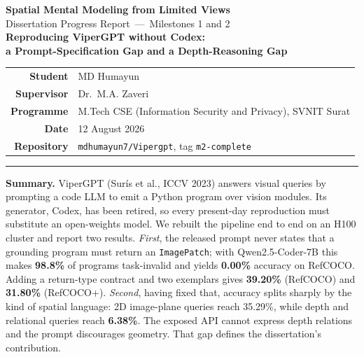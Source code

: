 \documentclass[11pt,a4paper]{article}
\newcommand{\up}[1]{\textcolor{good}{\textbf{#1}}}
\newcommand{\down}[1]{\textcolor{bad}{\textbf{#1}}}
\begin{document}
\begin{center}
{\LARGE\bfseries\color{navy} Spatial Mental Modeling from Limited Views}\\[4pt]
{\large Dissertation Progress Report~---~Milestones 1 and 2}\\[10pt]
{\large\bfseries Reproducing ViperGPT without Codex:}\\[2pt]
{\large\bfseries a Prompt-Specification Gap and a Depth-Reasoning Gap}\\[13pt]
\begin{tabular}{rl}
\textbf{Student} & MD Humayun \\
\textbf{Supervisor} & Dr.\ M.A. Zaveri \\
\textbf{Programme} & M.Tech CSE (Information Security and Privacy), SVNIT Surat \\
\textbf{Date} & 12 August 2026 \\
\textbf{Repository} & \texttt{mdhumayun7/Vipergpt}, tag \texttt{m2-complete} \\
\end{tabular}
\end{center}
\vspace{4pt}\hrule\vspace{9pt}

\begin{center}\begin{minipage}{0.93\textwidth}\small
\textbf{Summary.}\; ViperGPT (Sur\'is et al., ICCV 2023) answers visual queries by
prompting a code LLM to emit a Python program over vision modules. Its generator,
Codex, has been retired, so every present-day reproduction must substitute an
open-weights model. We rebuilt the pipeline end to end on an H100 cluster and report
two results. \emph{First}, the released prompt never states that a grounding program
must return an \texttt{ImagePatch}; with Qwen2.5-Coder-7B this makes \down{98.8\%} of
programs task-invalid and yields \down{0.00\%} accuracy on RefCOCO. Adding a
return-type contract and two exemplars gives \up{39.20\%} (RefCOCO) and \up{31.80\%}
(RefCOCO+). \emph{Second}, having fixed that, accuracy splits sharply by the kind of
spatial language: 2D image-plane queries reach 35.29\%, while depth and relational
queries reach \down{6.38\%}. The exposed API cannot express depth relations and the
prompt discourages geometry. That gap defines the dissertation's contribution.
\end{minipage}\end{center}
\vspace{6pt}
\end{document}
